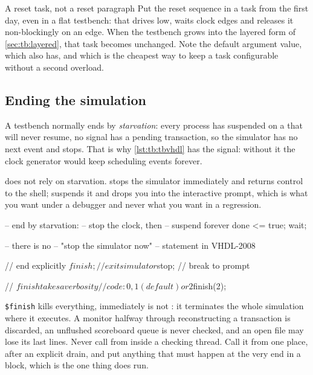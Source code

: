 \begin{tipbox}{A reset task, not a reset paragraph}
Put the reset sequence in a task from the first day, even in a flat testbench:
 that drives
 low, waits  clock edges and releases it
non-blockingly on an edge. When the testbench grows into the layered form of
\cref{sec:tb:layered}, that task becomes  unchanged.
Note the default argument value, which \VHDL{} also has, and which is the
cheapest way to keep a task configurable without a second overload.
\end{tipbox}

\subsection{Ending the simulation}

A \VHDL{} testbench normally ends by \emph{starvation}: every
process has suspended on a  that will never resume, no signal has a
pending transaction, so the simulator has no next event and stops. That is why
\cref{lst:tb:tbvhdl} has the  signal: without it the clock generator
would keep scheduling events forever.

\SV{} does not rely on starvation.  stops the simulator
immediately and returns control to the shell;  suspends it and
drops you into the interactive prompt, which is what you want under a debugger
and never what you want in a regression.

\begin{rosetta}
\begin{rleft}
-- end by starvation:
-- stop the clock, then
-- suspend forever
done <= true;
wait;

-- there is no
-- "stop the simulator now"
-- statement in VHDL-2008
\end{rleft}
\begin{rright}
// end explicitly
$finish;      // exit simulator
$stop;        // break to prompt

// $finish takes a verbosity
// code: 0, 1 (default) or 2
$finish(2);
\end{rright}
\end{rosetta}

\begin{gotcha}{\texttt{\$finish} kills everything, immediately}
 is not : it terminates the whole simulation where
it executes. A monitor halfway through reconstructing a transaction is
discarded, an unflushed scoreboard queue is never checked, and an open file may
lose its last lines. Never call  from inside a checking thread.
Call it from one place, after an explicit drain, and put anything that must
happen at the very end in a  block, which is the one thing
 does run.
\end{gotcha}

